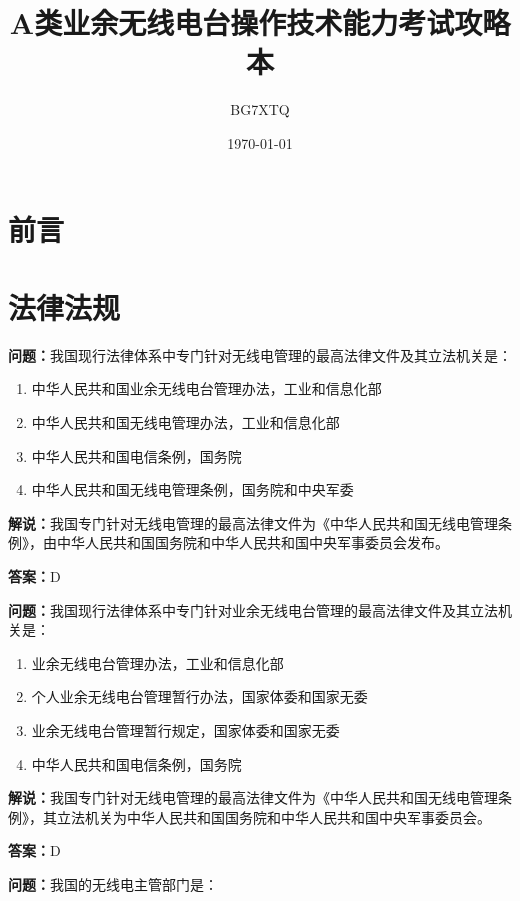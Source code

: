 \documentclass[UTF8]{ctexbook}
\title{A类业余无线电台操作技术能力考试攻略本}%
\author{BG7XTQ}%
\date{\today}%
\begin{document}

\maketitle%
\tableofcontents%

\chapter*{前言}

\chapter{法律法规}

\textbf{问题：}我国现行法律体系中专门针对无线电管理的最高法律文件及其立法机关是：

\begin{enumerate}[label=\Alph*), leftmargin=3em]
  \item 中华人民共和国业余无线电台管理办法，工业和信息化部
  \item 中华人民共和国无线电管理办法，工业和信息化部
  \item 中华人民共和国电信条例，国务院
  \item 中华人民共和国无线电管理条例，国务院和中央军委
\end{enumerate}

\textbf{解说：}我国专门针对无线电管理的最高法律文件为《中华人民共和国无线电管理条例》，由中华人民共和国国务院和中华人民共和国中央军事委员会发布。

\textbf{答案：}D

\textbf{问题：}我国现行法律体系中专门针对业余无线电台管理的最高法律文件及其立法机关是：

\begin{enumerate}[label=\Alph*), leftmargin=3em]
  \item 业余无线电台管理办法，工业和信息化部
  \item 个人业余无线电台管理暂行办法，国家体委和国家无委
  \item 业余无线电台管理暂行规定，国家体委和国家无委
  \item 中华人民共和国电信条例，国务院
\end{enumerate}

\textbf{解说：}我国专门针对无线电管理的最高法律文件为《中华人民共和国无线电管理条例》，其立法机关为中华人民共和国国务院和中华人民共和国中央军事委员会。

\textbf{答案：}D

\textbf{问题：}我国的无线电主管部门是：
\end{document}
